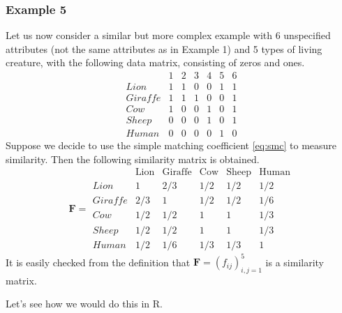 \documentclass[
]{book}
\theoremstyle{definition}
\theoremstyle{definition}
\theoremstyle{definition}
\theoremstyle{definition}
\theoremstyle{remark}
\begin{document}
\hypertarget{example-5}{%
\subsubsection*{Example 5}\label{example-5}}

Let us now consider a similar but more complex example with 6 unspecified attributes (not the same attributes as in Example 1) and 5 types of living creature, with the following data matrix, consisting of zeros and ones.
\[
\begin{array}{lcccccc}
&1&2&3&4&5&6\\
Lion&1&1&0&0&1&1\\
Giraffe&1&1&1&0&0&1\\
Cow&1&0&0&1&0&1\\
Sheep&0&0&0&1&0&1\\
Human&0&0&0&0&1&0
\end{array}
\]
Suppose we decide to use the simple matching coefficient \eqref{eq:smc} to measure similarity. Then the following similarity matrix is obtained.
\[
\mathbf F=\begin{array}{lccccc}
&\text{Lion}&\text{Giraffe}&\text{Cow}&\text{Sheep}&\text{Human}\\
Lion&1&2/3&1/2&1/2&1/2\\
Giraffe&2/3&1&1/2&1/2&1/6\\
Cow&1/2&1/2&1&1&1/3\\
Sheep&1/2&1/2&1&1&1/3\\
Human&1/2&1/6&1/3&1/3&1
\end{array}
\]
It is easily checked from the definition that \({\mathbf F}=(f_{ij})_{i,j=1}^5\) is a similarity matrix.

Let's see how we would do this in R.
\end{document}
